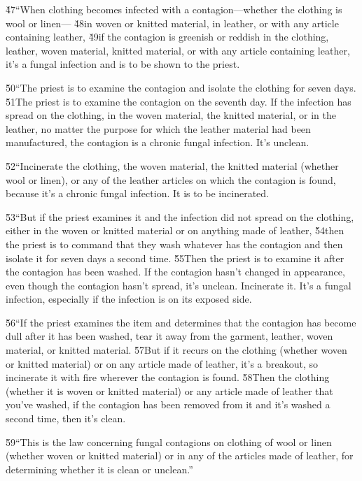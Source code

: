 \v{47}``When clothing becomes infected with a contagion---whether the clothing is wool or linen--- \v{48}in woven or knitted material, in leather, or with any article containing leather, \v{49}if the contagion is greenish or reddish in the clothing, leather, woven material, knitted material, or with any article containing leather, it's a fungal infection and is to be shown to the priest.

\v{50}``The priest is to examine the contagion and isolate the clothing for seven days. \v{51}The priest is to examine the contagion on the seventh day. If the infection has spread on the clothing, in the woven material, the knitted material, or in the leather, no matter the purpose for which the leather material had been manufactured, the contagion is a chronic fungal infection. It's unclean.

\v{52}``Incinerate the clothing, the woven material, the knitted material (whether wool or linen), or any of the leather articles on which the contagion is found, because it's a chronic fungal infection. It is to be incinerated.

\v{53}``But if the priest examines it and the infection did not spread on the clothing, either in the woven or knitted material or on anything made of leather, \v{54}then the priest is to command that they wash whatever has the contagion and then isolate it for seven days a second time. \v{55}Then the priest is to examine it after the contagion has been washed. If the contagion hasn't changed in appearance, even though the contagion hasn't spread, it's unclean. Incinerate it. It's a fungal infection, especially if the infection is on its exposed side.

\v{56}``If the priest examines the item and determines that the contagion has become dull after it has been washed, tear it away from the garment, leather, woven material, or knitted material. \v{57}But if it recurs on the clothing (whether woven or knitted material) or on any article made of leather, it's a breakout, so incinerate it with fire wherever the contagion is found. \v{58}Then the clothing (whether it is woven or knitted material) or any article made of leather that you've washed, if the contagion has been removed from it and it's washed a second time, then it's clean.

\v{59}``This is the law concerning fungal contagions on clothing of wool or linen (whether woven or knitted material) or in any of the articles made of leather, for determining whether it is clean or unclean.''

